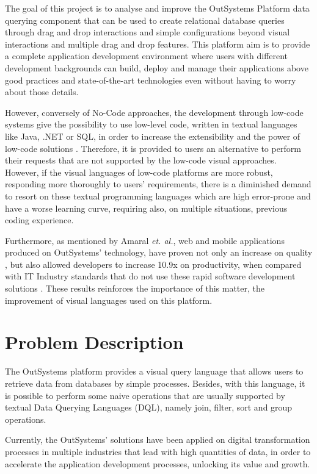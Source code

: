 The goal of this project is to analyse and improve the OutSystems Platform data querying component that can be used to create relational database queries through drag and drop interactions and simple configurations beyond visual interactions and multiple drag and drop features. This platform aim is to provide a complete application development environment where users with different development backgrounds can build, deploy and manage their applications above good practices and state-of-the-art technologies even without having to worry about those details.

However, conversely of No-Code approaches, the development through low-code systems give the possibility to use low-level code, written in textual languages like Java, .NET or SQL, in order to increase the extensibility and the power of low-code solutions \cite{outsystems_lowcodeVsNocode}. Therefore, it is provided to users an alternative to perform their requests that are not supported by the low-code visual approaches. However, if the visual languages of low-code platforms are more robust, responding more thoroughly to users’ requirements, there is a diminished demand to resort on these textual programming languages which are high error-prone and have a worse learning curve, requiring also, on multiple situations, previous coding experience.

Furthermore, as mentioned by  Amaral \textit{et. al.}, web and mobile applications produced on OutSystems’ technology, have proven not only an increase on quality \cite{improvingTheDeveloperExperienceWithALowCodeProcessModellingLanguage}, but also allowed developers to increase 10.9x on productivity, when compared with  IT Industry standards that do not use these rapid software development solutions \cite{outByNumbers2013}. These results reinforces the importance of this matter, the improvement of visual languages used on this platform.


\section{Problem Description}
\label{sec:problem_description}
The OutSystems platform provides a visual query language that allows users to retrieve data from databases by simple processes. Besides, with this language, it is possible to perform some naive operations that are usually supported by textual Data Querying Languages (DQL), namely join, filter, sort and group operations.

Currently, the OutSystems’ solutions have been applied on digital transformation processes in multiple industries that lead with high quantities of data, in order to accelerate the application development processes, unlocking its value and growth.

